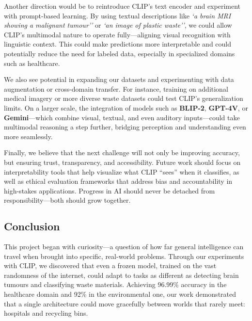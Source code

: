\documentclass[12pt]{article}
\begin{document}
Another direction would be to reintroduce CLIP’s text encoder and experiment with prompt-based learning. By using textual descriptions like \textit{`a brain MRI showing a malignant tumour''} or \textit{`an image of plastic waste''}, we could allow CLIP’s multimodal nature to operate fully---aligning visual recognition with linguistic context. This could make predictions more interpretable and could potentially reduce the need for labeled data, especially in specialized domains such as healthcare.

We also see potential in expanding our datasets and experimenting with data augmentation or cross-domain transfer. For instance, training on additional medical imagery or more diverse waste datasets could test CLIP’s generalization limits. On a larger scale, the integration of models such as \textbf{BLIP-2}, \textbf{GPT-4V}, or \textbf{Gemini}---which combine visual, textual, and even auditory inputs---could take multimodal reasoning a step further, bridging perception and understanding even more seamlessly.

Finally, we believe that the next challenge will not only be improving accuracy, but ensuring trust, transparency, and accessibility. Future work should focus on interpretability tools that help visualize what CLIP ``sees'' when it classifies, as well as ethical evaluation frameworks that address bias and accountability in high-stakes applications. Progress in AI should never be detached from responsibility---both should grow together.

\subsection{Conclusion}
This project began with curiosity---a question of how far general intelligence can travel when brought into specific, real-world problems. Through our experiments with CLIP, we discovered that even a frozen model, trained on the vast randomness of the internet, could adapt to tasks as different as detecting brain tumours and classifying waste materials. Achieving 96.99\% accuracy in the healthcare domain and 92\% in the environmental one, our work demonstrated that a single architecture could move gracefully between worlds that rarely meet: hospitals and recycling bins.
\end{document}
